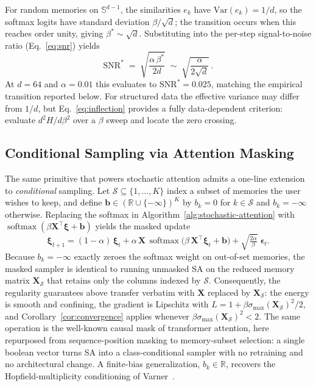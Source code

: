 For random memories on $\mathbb{S}^{d-1}$, the similarities $e_k$ have $\mathrm{Var}(e_k)=1/d$, so the softmax logits have standard deviation $\beta/\sqrt{d}$; the transition occurs when this reaches order unity, giving $\beta^{*}\sim\sqrt{d}$. Substituting into the per-step signal-to-noise ratio (Eq.~\ref{eq:snr}) yields
\begin{equation}\label{eq:snr-star}
\mathrm{SNR}^{*} \;=\; \sqrt{\frac{\alpha\,\beta^{*}}{2d}} \;\sim\; \sqrt{\frac{\alpha}{2\sqrt{d}}}\,.
\end{equation}
At $d{=}64$ and $\alpha{=}0.01$ this evaluates to $\mathrm{SNR}^{*}=0.025$, matching the empirical transition reported below. For structured data the effective variance may differ from $1/d$, but Eq.~\eqref{eq:inflection} provides a fully data-dependent criterion: evaluate $d^{2}H/d\beta^{2}$ over a $\beta$ sweep and locate the zero crossing.

\subsection{Conditional Sampling via Attention Masking}\label{sec:masking}

The same primitive that powers stochastic attention admits a one-line extension to \emph{conditional} sampling. Let $\mathcal{S}\subseteq\{1,\dots,K\}$ index a subset of memories the user wishes to keep, and define $\mathbf{b}\in(\mathbb{R}\cup\{-\infty\})^{K}$ by $b_{k}=0$ for $k\in\mathcal{S}$ and $b_{k}=-\infty$ otherwise. Replacing the softmax in Algorithm~\ref{alg:stochastic-attention} with $\operatorname{softmax}(\beta\mathbf{X}^{\top}\boldsymbol{\xi}+\mathbf{b})$ yields the masked update
\begin{equation}\label{eq:masked-sa}
\boldsymbol{\xi}_{t+1}
= (1-\alpha)\,\boldsymbol{\xi}_t
  + \alpha\,\mathbf{X}\,\operatorname{softmax}\!\bigl(\beta\,\mathbf{X}^{\top}\boldsymbol{\xi}_t+\mathbf{b}\bigr)
  + \sqrt{\tfrac{2\alpha}{\beta}}\;\boldsymbol{\epsilon}_t.
\end{equation}
Because $b_{k}=-\infty$ exactly zeroes the softmax weight on out-of-set memories, the masked sampler is identical to running unmasked SA on the reduced memory matrix $\mathbf{X}_{\mathcal{S}}$ that retains only the columns indexed by $\mathcal{S}$. Consequently, the regularity guarantees above transfer verbatim with $\mathbf{X}$ replaced by $\mathbf{X}_{\mathcal{S}}$: the energy is smooth and confining, the gradient is Lipschitz with $L=1+\beta\sigma_{\max}(\mathbf{X}_{\mathcal{S}})^{2}/2$, and Corollary~\ref{cor:convergence} applies whenever $\beta\sigma_{\max}(\mathbf{X}_{\mathcal{S}})^{2}<2$. The same operation is the well-known causal mask of transformer attention, here repurposed from sequence-position masking to memory-subset selection: a single boolean vector turns SA into a class-conditional sampler with no retraining and no architectural change. A finite-bias generalization, $b_{k}\in\mathbb{R}$, recovers the Hopfield-multiplicity conditioning of Varner~\cite{varnerConditioningProtein2026}.

